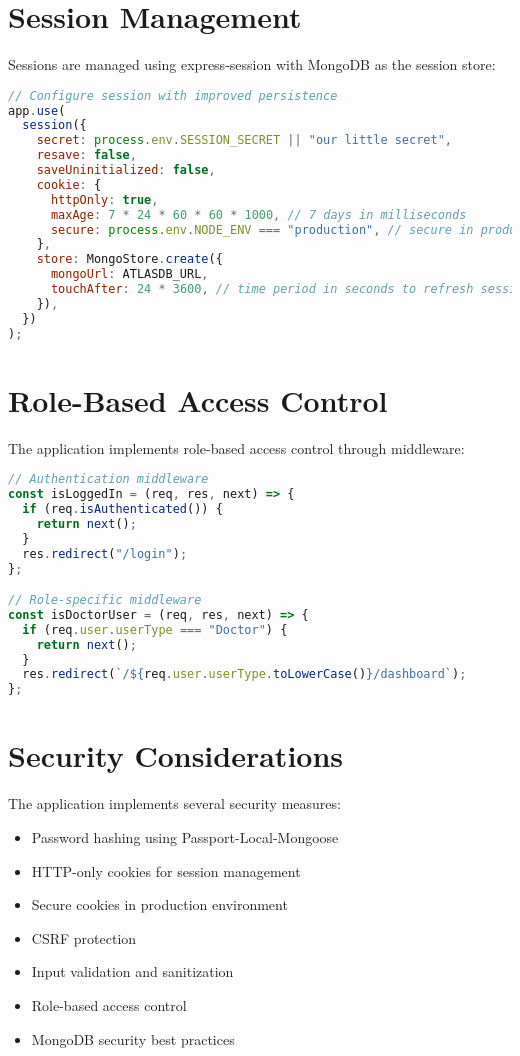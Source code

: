 \documentclass[12pt,a4paper]{report}
\begin{document}
\section{Session Management}
Sessions are managed using express-session with MongoDB as the session store:

\begin{lstlisting}[language=JavaScript]
// Configure session with improved persistence
app.use(
  session({
    secret: process.env.SESSION_SECRET || "our little secret",
    resave: false,
    saveUninitialized: false,
    cookie: {
      httpOnly: true,
      maxAge: 7 * 24 * 60 * 60 * 1000, // 7 days in milliseconds
      secure: process.env.NODE_ENV === "production", // secure in production only
    },
    store: MongoStore.create({
      mongoUrl: ATLASDB_URL,
      touchAfter: 24 * 3600, // time period in seconds to refresh session (1 day)
    }),
  })
);
\end{lstlisting}

\section{Role-Based Access Control}
The application implements role-based access control through middleware:

\begin{lstlisting}[language=JavaScript]
// Authentication middleware
const isLoggedIn = (req, res, next) => {
  if (req.isAuthenticated()) {
    return next();
  }
  res.redirect("/login");
};

// Role-specific middleware
const isDoctorUser = (req, res, next) => {
  if (req.user.userType === "Doctor") {
    return next();
  }
  res.redirect(`/${req.user.userType.toLowerCase()}/dashboard`);
};
\end{lstlisting}

\section{Security Considerations}
The application implements several security measures:

\begin{itemize}
    \item Password hashing using Passport-Local-Mongoose
    \item HTTP-only cookies for session management
    \item Secure cookies in production environment
    \item CSRF protection
    \item Input validation and sanitization
    \item Role-based access control
    \item MongoDB security best practices
\end{itemize}
\end{document}
